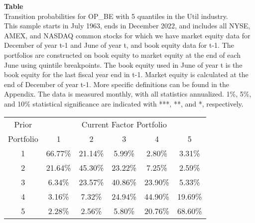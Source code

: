\begin{table*}[ht!]
\raggedright
{}
\label{tab: transition_probs_OP_BE_Util_with_5_quantiles}
\textbf{Table \thetable} \\
Transition probabilities for OP_BE with 5 quantiles in the Util industry. \\
\hspace*{1em}This sample starts in July 1963, ends in December 2022, and includes all NYSE, AMEX, and NASDAQ common stocks for which we have market equity data for December of year t-1 and June of year t, and book equity data for t-1. The portfolios are constructed on book equity to market equity at the end of each June using quintile breakpoints.  The book equity used in June of year t is the book equity for the last fiscal year end in t-1.  Market equity is calculated at the end of December of year t-1.  More specific definitions can be found in the Appendix.  The data is measured monthly, with all statistics annualized.  1\%, 5\%, and 10\% statistical significance are indicated with ***, **, and *, respectively. \\
\vspace{0.5em}
\centering
\begin{adjustbox}{max width=\textwidth}
\begin{tabular}{@{}cccccc@{}}
\toprule
Prior & \multicolumn{5}{c}{Current Factor Portfolio} \\
Portfolio & 1 & 2 & 3 & 4 & 5 \\
\midrule
1 & 66.77\% & 21.14\% & 5.99\% & 2.80\% & 3.31\% \\
2 & 21.64\% & 45.30\% & 23.22\% & 7.25\% & 2.59\% \\
3 & 6.34\% & 23.57\% & 40.86\% & 23.90\% & 5.33\% \\
4 & 3.16\% & 7.32\% & 24.94\% & 44.90\% & 19.69\% \\
5 & 2.28\% & 2.56\% & 5.80\% & 20.76\% & 68.60\% \\
\bottomrule
\end{tabular}
\end{adjustbox}
\end{table*}